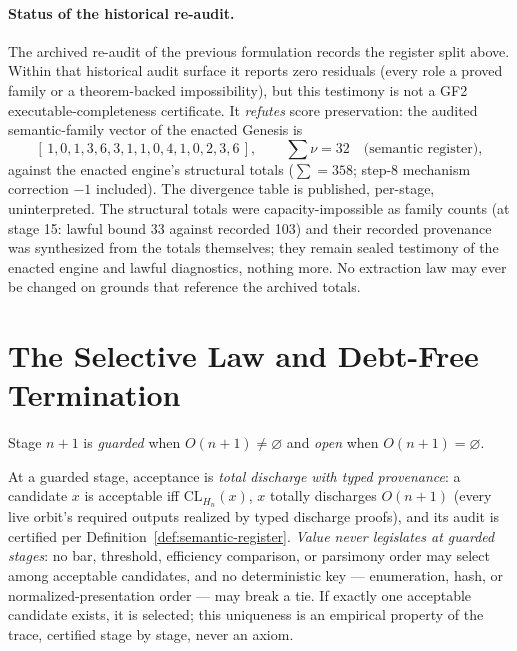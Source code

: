 \paragraph{Status of the historical re-audit.}
The archived re-audit of the previous formulation records the register split
above. Within that historical audit surface it reports zero residuals (every
role a proved family or a theorem-backed impossibility), but this testimony is
not a GF2 executable-completeness certificate. It \emph{refutes} score
preservation: the audited
semantic-family vector of the enacted Genesis is
\[
[\,1,0,1,3,6,3,1,1,0,4,1,0,2,3,6\,], \qquad \textstyle\sum\nu = 32
\quad\text{(semantic register)},
\]
against the enacted engine's structural totals (\(\sum = 358\); step-8
mechanism correction \(-1\) included). The divergence table is published,
per-stage, uninterpreted. The structural totals were capacity-impossible as
family counts (at stage 15: lawful bound 33 against recorded 103) and their
recorded provenance was synthesized from the totals themselves; they remain
sealed testimony of the enacted engine and lawful diagnostics, nothing more.
No extraction law may ever be changed on grounds that reference the archived
totals.

\section{The Selective Law and Debt-Free Termination}

\begin{definition}
Stage \(n+1\) is \emph{guarded} when \(O(n+1)\neq\varnothing\) and \emph{open}
when \(O(n+1)=\varnothing\).
\end{definition}

\begin{definition}
\label{def:guarded-register}
At a guarded stage, acceptance is \emph{total discharge with typed
provenance}: a candidate \(x\) is acceptable iff \(\mathrm{CL}_{H_n}(x)\),
\(x\) totally discharges \(O(n+1)\) (every live orbit's required outputs
realized by typed discharge proofs), and its audit is certified per
Definition~\ref{def:semantic-register}. \emph{Value never legislates at
guarded stages}: no bar, threshold, efficiency comparison, or parsimony order
may select among acceptable candidates, and no deterministic key ---
enumeration, hash, or normalized-presentation order --- may break a tie. If
exactly one acceptable candidate exists, it is selected; this uniqueness is
an empirical property of the trace, certified stage by stage, never an axiom.
\end{definition}


